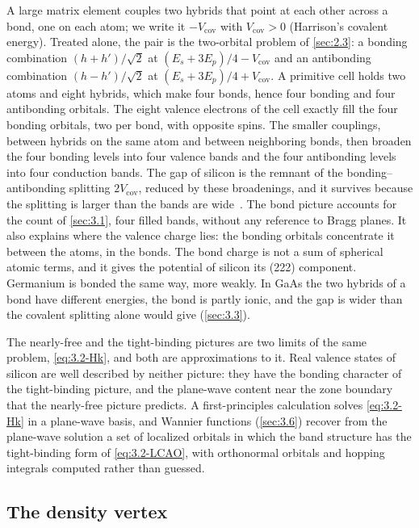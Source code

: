 A large matrix element couples two hybrids that point at each other across a bond, one on each atom; we write it $-V_{\mathrm{cov}}$ with $V_{\mathrm{cov}} > 0$ (Harrison's covalent energy). Treated alone, the pair is the two-orbital problem of \cref{sec:2.3}: a bonding combination $(h + h')/\sqrt2$ at $(E_s + 3E_p)/4 - V_{\mathrm{cov}}$ and an antibonding combination $(h - h')/\sqrt2$ at $(E_s + 3E_p)/4 + V_{\mathrm{cov}}$. A primitive cell holds two atoms and eight hybrids, which make four bonds, hence four bonding and four antibonding orbitals. The eight valence electrons of the cell exactly fill the four bonding orbitals, two per bond, with opposite spins. The smaller couplings, between hybrids on the same atom and between neighboring bonds, then broaden the four bonding levels into four valence bands and the four antibonding levels into four conduction bands. The gap of silicon is the remnant of the bonding--antibonding splitting $2V_{\mathrm{cov}}$, reduced by these broadenings, and it survives because the splitting is larger than the bands are wide~\cite[Chap.~3]{harrison1980electronic}. The bond picture accounts for the count of \cref{sec:3.1}, four filled bands, without any reference to Bragg planes. It also explains where the valence charge lies: the bonding orbitals concentrate it between the atoms, in the bonds. The bond charge is not a sum of spherical atomic terms, and it gives the potential of silicon its (222) component. Germanium is bonded the same way, more weakly. In GaAs the two hybrids of a bond have different energies, the bond is partly ionic, and the gap is wider than the covalent splitting alone would give (\cref{sec:3.3}).

The nearly-free and the tight-binding pictures are two limits of the same problem, \cref{eq:3.2-Hk}, and both are approximations to it. Real valence states of silicon are well described by neither picture: they have the bonding character of the tight-binding picture, and the plane-wave content near the zone boundary that the nearly-free picture predicts. A first-principles calculation solves \cref{eq:3.2-Hk} in a plane-wave basis, and Wannier functions (\cref{sec:3.6}) recover from the plane-wave solution a set of localized orbitals in which the band structure has the tight-binding form of \cref{eq:3.2-LCAO}, with orthonormal orbitals and hopping integrals computed rather than guessed.

\subsection{The density vertex}

